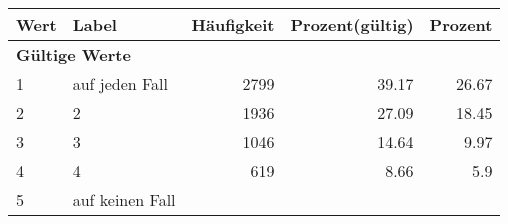      \begin{longtable}{lXrrr}
     \toprule
     \textbf{Wert} & \textbf{Label} & \textbf{Häufigkeit} & \textbf{Prozent(gültig)} & \textbf{Prozent} \\
     \endhead
     \midrule
     \multicolumn{5}{l}{\textbf{Gültige Werte}}\\

     1 &
     \multicolumn{1}{X}{ auf jeden Fall   } &


       \num{2799} &
       \num[round-mode=places,round-precision=2]{39,17} &
         \num[round-mode=places,round-precision=2]{26,67} \\

     2 &
     \multicolumn{1}{X}{ 2   } &


       \num{1936} &
       \num[round-mode=places,round-precision=2]{27,09} &
         \num[round-mode=places,round-precision=2]{18,45} \\

     3 &
     \multicolumn{1}{X}{ 3   } &


       \num{1046} &
       \num[round-mode=places,round-precision=2]{14,64} &
         \num[round-mode=places,round-precision=2]{9,97} \\

     4 &
     \multicolumn{1}{X}{ 4   } &


       \num{619} &
       \num[round-mode=places,round-precision=2]{8,66} &
         \num[round-mode=places,round-precision=2]{5,9} \\

     5 &
     \multicolumn{1}{X}{ auf keinen Fall   } &



\end{longtable}
